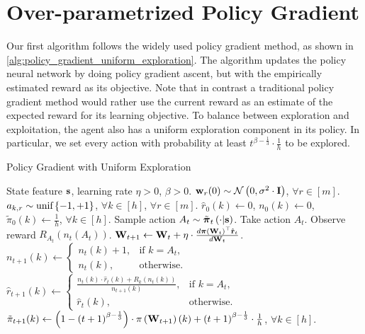 \section{Over-parametrized Policy Gradient}
\label{sec:policy_gradient}

Our first algorithm follows the widely used policy gradient method, as shown in \cref{alg:policy_gradient_uniform_exploration}.
The algorithm updates the policy neural network by doing policy gradient ascent, but with the empirically estimated reward as its objective. 
Note that in contrast a traditional policy gradient method would rather use the current reward as an estimate of the expected reward for its learning objective.
To balance between exploration and exploitation, the agent also has a uniform exploration component in its policy. 
In particular, we set every action with probability at least $t^{ \beta - \frac{1}{3}} \cdot \frac{1}{h}$ to be explored. 
\begin{algorithm}[t]
   \caption{Policy Gradient with Uniform Exploration}
\label{alg:policy_gradient_uniform_exploration}
\begin{algorithmic}
    State feature ${\mathbf{s}}$, learning rate $\eta > 0$, $\beta > 0$.
   \STATE ${\mathbf{w}}_r(0) \sim {\mathcal{N}}\left( 0, \sigma^2 \cdot {\mathbf{I}} \right)$, $\forall r \in [m]$. $a_{k, r} \sim 
   {\text{unif}}\left\{-1, +1\right\}$, $\forall k \in [h]$, $\forall r \in [m]$.
   \STATE $\hat{r}_{0}(k) \gets 0$, $n_{0}(k) \gets 0$, $\tilde{\pi}_0(k) \gets \frac{1}{h}$, $\forall k \in [h]$.
   \STATE Sample action $A_{t} \sim \tilde{{\boldsymbol{\pi}}}_{t}\left(\cdot \middle| {\mathbf{s}} \right)$. Take action $A_{t}$. Observe reward $R_{ A_{t}}\left(n_{t}\left(A_t\right) \right)$.
   \STATE ${\mathbf{W}}_{t+1} \leftarrow {\mathbf{W}}_t + \eta \cdot \frac{d {\boldsymbol{\pi}}\left({\mathbf{W}}_t\right)^\top \hat{{\mathbf{r}}}_t}{d {\mathbf{W}}_t}$.
   \STATE $n_{t+1}(k) \gets \left. 
		\begin{cases}
		n_{t}(k) + 1, & \text{if } k = A_t, \\
		n_{t}(k), & \text{otherwise}.
		\end{cases}
		\right. \qquad$ 
   $\hat{r}_{t+1}(k) \gets \left. 
		\begin{cases}
		\frac{n_{t}(k) \cdot \hat{r}_{t}(k) + R_{k}\left(n_{t}(k)\right) }{n_{t+1}(k)}, & \text{if } k = A_t, \\
		\hat{r}_{t}(k), & \text{otherwise}.
		\end{cases}
		\right.$
   \STATE $\tilde{\pi}_{t+1}(k) \gets \left( 1 - \left(t+1\right)^{ \beta - \frac{1}{3}} \right) \cdot \pi\left({\mathbf{W}}_{t+1}\right)(k) + \left(t+1\right)^{ \beta - \frac{1}{3}} \cdot \frac{1}{h}$, $\forall k \in [h]$.
   \ENDFOR
\end{algorithmic}
\end{algorithm}

